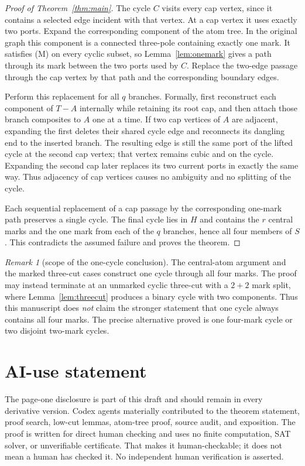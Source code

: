 \documentclass[11pt]{article}
\theoremstyle{definition}
\theoremstyle{remark}
\newtheorem{remark}[theorem]{Remark}
\begin{document}
\begin{proof}[Proof of Theorem~\ref{thm:main}]
The cycle \(C\) visits every cap vertex, since it contains a selected
edge incident with that vertex.  At a cap vertex it uses exactly two
ports.  Expand the corresponding component of the atom tree.  In the
original graph this component is a connected three-pole containing
exactly one mark.  It satisfies (M) on every cyclic subset, so
Lemma~\ref{lem:onemark} gives a path through its mark between the two
ports used by \(C\).  Replace the two-edge passage through the cap
vertex by that path and the corresponding boundary edges.

Perform this replacement for all \(q\) branches.  Formally, first
reconstruct each component of \(T-A\) internally while retaining its
root cap, and then attach those branch composites to \(A\) one at a
time.  If two cap vertices of \(A\) are adjacent, expanding the
first deletes their shared cycle edge and reconnects its dangling end
to the inserted branch.  The resulting edge is still the same port of
the lifted cycle at the second cap vertex; that vertex remains cubic and
on the cycle.  Expanding the second cap later replaces its two current
ports in exactly the same way.  Thus adjacency of cap vertices causes
no ambiguity and no splitting of the cycle.

Each sequential replacement of a cap passage by the corresponding
one-mark path preserves a single cycle.  The final cycle lies in \(H\)
and contains the \(r\) central marks and the one mark from each of the
\(q\) branches, hence all four members of \(S\).  This contradicts the
assumed failure and proves the theorem.
\end{proof}

\begin{remark}[scope of the one-cycle conclusion]\label{rem:onecycle}
The central-atom argument and the marked three-cut cases construct one
cycle through all four marks.  The proof may instead terminate at an
unmarked cyclic three-cut with a \(2+2\) mark split, where
Lemma~\ref{lem:threecut} produces a binary cycle with two components.
Thus this manuscript does \emph{not} claim the stronger statement that
one cycle always contains all four marks.  The precise alternative
proved is one four-mark cycle or two disjoint two-mark cycles.
\end{remark}

\section*{AI-use statement}

The page-one disclosure is part of this draft and should remain in every
derivative version.  Codex agents materially contributed to the theorem
statement, proof search, low-cut lemmas, atom-tree proof, source audit,
and exposition.  The proof is written for direct human checking and
uses no finite computation, SAT solver, or unverifiable certificate.
That makes it human-checkable; it does not mean a human has checked it.
No independent human verification is asserted.
\end{document}
